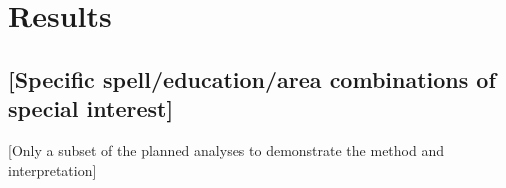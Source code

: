 \documentclass[12pt,letterpaper]{article}
\begin{document}
\section{Results\label{sec:results}}















\subsection{[Specific spell/education/area combinations of special interest]}
[Only a subset of the planned analyses to demonstrate the method and interpretation]


\end{document}
